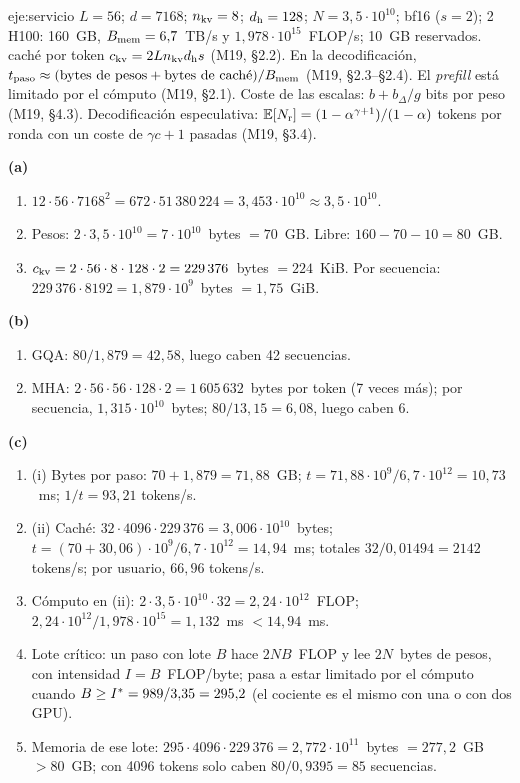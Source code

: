 \begin{solucion}{eje:servicio}
\datos $L=56$; $d=7168$; $n_{\mathrm{kv}}=8$; $d_{\mathrm{h}}=128$; $N=3{,}5\cdot 10^{10}$; bf16 ($s=2$); 2 H100: 160~GB, $B_{\mathrm{mem}}=6{,}7$~TB/s y $1{,}978\cdot 10^{15}$~FLOP/s; 10~GB reservados.
\planteamiento caché por token $c_{\mathrm{kv}}=2Ln_{\mathrm{kv}}d_{\mathrm{h}} s$ (M19, §2.2). En la decodificación, $t_{\mathrm{paso}}\approx(\text{bytes de pesos}+\text{bytes de caché})/B_{\mathrm{mem}}$ (M19, §2.3--§2.4). El \emph{prefill} está limitado por el cómputo (M19, §2.1). Coste de las escalas: $b+b_{\Delta}/g$ bits por peso (M19, §4.3). Decodificación especulativa: $\mathbb{E}[N_{\mathrm{r}}]=(1-\alpha^{\gamma+1})/(1-\alpha)$ tokens por ronda con un coste de $\gamma c+1$ pasadas (M19, §3.4).
\pasos

\noindent\textbf{(a)}
\begin{enumerate}[label=\arabic*.]
  \item $12\cdot 56\cdot 7168^{2}=672\cdot 51\,380\,224=3{,}453\cdot 10^{10}\approx 3{,}5\cdot 10^{10}$.
  \item Pesos: $2\cdot 3{,}5\cdot 10^{10}=7\cdot 10^{10}$~bytes $=70$~GB. Libre: $160-70-10=80$~GB.
  \item $c_{\mathrm{kv}}=2\cdot 56\cdot 8\cdot 128\cdot 2=229\,376$~bytes $=224$~KiB. Por secuencia: $229\,376\cdot 8192=1{,}879\cdot 10^{9}$~bytes $=1{,}75$~GiB.
\end{enumerate}

\noindent\textbf{(b)}
\begin{enumerate}[label=\arabic*.]
  \item GQA: $80/1{,}879=42{,}58$, luego caben 42 secuencias.
  \item MHA: $2\cdot 56\cdot 56\cdot 128\cdot 2=1\,605\,632$~bytes por token (7 veces más); por secuencia, $1{,}315\cdot 10^{10}$~bytes; $80/13{,}15=6{,}08$, luego caben 6.
\end{enumerate}

\noindent\textbf{(c)}
\begin{enumerate}[label=\arabic*.]
  \item (i) Bytes por paso: $70+1{,}879=71{,}88$~GB; $t=71{,}88\cdot 10^{9}/6{,}7\cdot 10^{12}=10{,}73$~ms; $1/t=93{,}21$ tokens/s.
  \item (ii) Caché: $32\cdot 4096\cdot 229\,376=3{,}006\cdot 10^{10}$~bytes; $t=(70+30{,}06)\cdot 10^{9}/6{,}7\cdot 10^{12}=14{,}94$~ms; totales $32/0{,}01494=2142$ tokens/s; por usuario, $66{,}96$ tokens/s.
  \item Cómputo en (ii): $2\cdot 3{,}5\cdot 10^{10}\cdot 32=2{,}24\cdot 10^{12}$~FLOP; $2{,}24\cdot 10^{12}/1{,}978\cdot 10^{15}=1{,}132$~ms $<14{,}94$~ms.
  \item Lote crítico: un paso con lote $B$ hace $2NB$~FLOP y lee $2N$~bytes de pesos, con intensidad $I=B$~FLOP/byte; pasa a estar limitado por el cómputo cuando $B\ge I^{\ast}=989/3{,}35=295{,}2$ (el cociente es el mismo con una o con dos GPU).
  \item Memoria de ese lote: $295\cdot 4096\cdot 229\,376=2{,}772\cdot 10^{11}$~bytes $=277{,}2$~GB $>80$~GB; con 4096 tokens solo caben $80/0{,}9395=85$ secuencias.
\end{enumerate}


\end{solucion}
